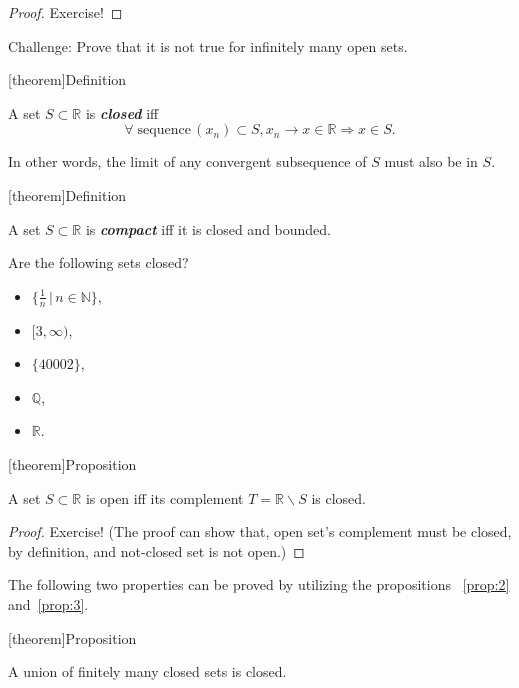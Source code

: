 \documentclass[12pt]{report}
\theoremstyle{definition}
\begin{document}
\begin{proof}
    Exercise!
\end{proof} 

Challenge: Prove that it is not true for infinitely many open sets.

[theorem]{Definition}
\begin{closed set}
    A set $S\subset\mathbb{R}$ is \textbf{\emph{closed}} iff \[
        \forall\;\text{sequence}\,(x_n)\subset S,
        x_n\rightarrow x\in\mathbb{R}\Longrightarrow x\in S.
    \]
\end{closed set}
In other words, the limit of any convergent subsequence of $S$
must also be in $S$.

[theorem]{Definition}
\begin{compact set}
    A set $S\subset\mathbb{R}$ is \textbf{\emph{compact}} iff it is closed and
    bounded.
\end{compact set}

\begin{ex}
    Are the following sets closed?
    \begin{itemize}
        \item $\{\frac{1}{n}\,|\,n\in\mathbb{N}\}$,
        \item $[3,\infty)$, %
        \item $\{40002\}$,
        \item $\mathbb{Q}$,
        \item $\mathbb{R}$.
    \end{itemize}
\end{ex} 

[theorem]{Proposition}
\begin{open set complement is closed}
    A set $S\subset\mathbb{R}$ is open iff
    its complement $T=\mathbb{R}\backslash S$ is closed.
\end{open set complement is closed}

\begin{proof}
    Exercise!
    (The proof can show that, open set's complement must be closed, by definition,
    and not-closed set is not open.)
\end{proof} 


The following two properties can be proved by utilizing the propositions%
~\ref{prop:2} and~\ref{prop:3}.

[theorem]{Proposition}
\begin{union of finite closed sets is closed}
    A union of finitely many closed sets is closed.
\end{union of finite closed sets is closed}
\end{document}
